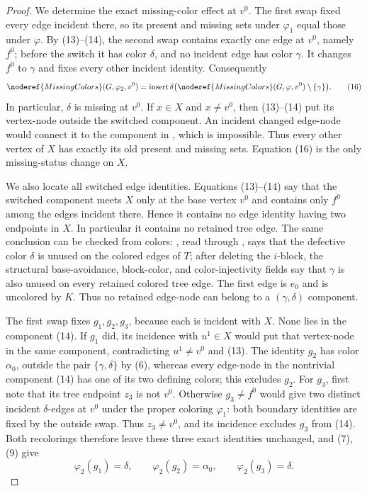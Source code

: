 \begin{proof}
We determine the exact missing-color effect at $v^0$.  The first swap
fixed every edge incident there, so its present and missing sets under
$\varphi_1$ equal those under $\varphi$.  By (13)--(14), the second swap
contains exactly one edge at $v^0$, namely $f^0$; before the switch it has
color $\delta$, and no incident edge has color $\gamma$.  It changes
$f^0$ to $\gamma$ and fixes every other incident identity.  Consequently
\[
 \noderef{MissingColors}(G,\varphi_2,v^0)
  =\operatorname{insert}\delta
     \bigl(\noderef{MissingColors}(G,\varphi,v^0)
       \setminus\{\gamma\}\bigr).                             \tag{16}
\]
In particular, $\delta$ is missing at $v^0$.  If $x\in X$ and
$x\ne v^0$, then (13)--(14) put its vertex-node outside the switched
component.  An incident changed edge-node would connect it to the
component in , which is impossible.
Thus every other vertex of $X$ has exactly its old present and missing
sets.  Equation (16) is the only missing-status change on $X$.

We also locate all switched edge identities.  Equations (13)--(14) say
that the switched component meets $X$ only at the base vertex $v^0$ and
contains only $f^0$ among the edges incident there.  Hence it contains no
edge identity having two endpoints in $X$.  In particular it contains no
retained tree edge.  The same conclusion can be checked from colors:
, read through
, says that the defective color $\delta$ is unused
on the colored edges of $T$; after deleting the $i$-block, the structural
base-avoidance, block-color, and color-injectivity fields say that
$\gamma$ is also unused on every retained colored tree edge.  The first
edge is $e_0$ and is uncolored by $K$.  Thus no retained edge-node can
belong to a $(\gamma,\delta)$ component.

The first swap fixes $g_1,g_2,g_3$, because each is incident with $X$.
None lies in the component (14).  If $g_1$ did, its incidence with
$u^1\in X$ would put that vertex-node in the same component, contradicting
$u^1\ne v^0$ and (13).  The identity $g_2$ has color $\alpha_0$, outside
the pair $\{\gamma,\delta\}$ by (6), whereas every edge-node in the
nontrivial component (14) has one of its two defining colors; this excludes
$g_2$.  For $g_3$, first note that its tree endpoint $z_3$ is not $v^0$.
Otherwise $g_3\ne f^0$ would give two distinct
incident $\delta$-edges at $v^0$ under the proper coloring $\varphi_1$:
both boundary identities are fixed by the outside swap.  Thus
$z_3\ne v^0$, and its incidence excludes $g_3$ from (14).  Both
recolorings therefore leave these three exact identities unchanged, and
(7), (9) give
\[
 \varphi_2(g_1)=\delta,\qquad
 \varphi_2(g_2)=\alpha_0,\qquad
 \varphi_2(g_3)=\delta.                                      \tag{17}
\]


\end{proof}
